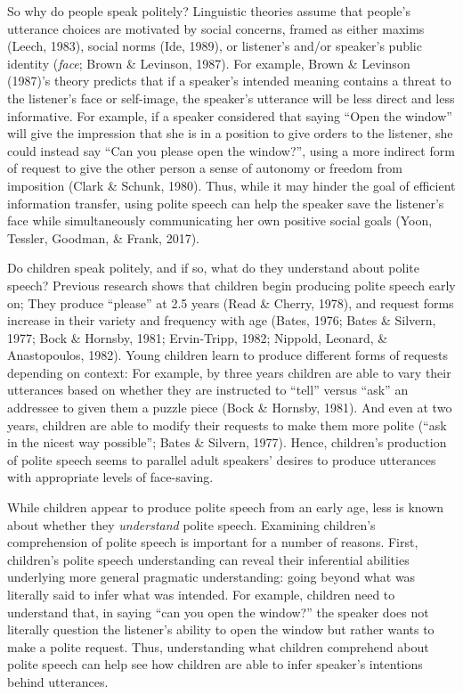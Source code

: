 \documentclass[10pt, letterpaper]{article}
\begin{document}
So why do people speak politely? Linguistic theories assume that
people's utterance choices are motivated by social concerns, framed as
either maxims (Leech, 1983), social norms (Ide, 1989), or listener's
and/or speaker's public identity (\emph{face}; Brown \& Levinson, 1987).
For example, Brown \& Levinson (1987)'s theory predicts that if a
speaker's intended meaning contains a threat to the listener's face or
self-image, the speaker's utterance will be less direct and less
informative. For example, if a speaker considered that saying ``Open the
window'' will give the impression that she is in a position to give
orders to the listener, she could instead say ``Can you please open the
window?'', using a more indirect form of request to give the other
person a sense of autonomy or freedom from imposition (Clark \& Schunk,
1980). Thus, while it may hinder the goal of efficient information
transfer, using polite speech can help the speaker save the listener's
face while simultaneously communicating her own positive social goals
(Yoon, Tessler, Goodman, \& Frank, 2017).

Do children speak politely, and if so, what do they understand about
polite speech? Previous research shows that children begin producing
polite speech early on; They produce ``please'' at 2.5 years (Read \&
Cherry, 1978), and request forms increase in their variety and frequency
with age (Bates, 1976; Bates \& Silvern, 1977; Bock \& Hornsby, 1981;
Ervin-Tripp, 1982; Nippold, Leonard, \& Anastopoulos, 1982). Young
children learn to produce different forms of requests depending on
context: For example, by three years children are able to vary their
utterances based on whether they are instructed to ``tell'' versus
``ask'' an addressee to given them a puzzle piece (Bock \& Hornsby,
1981). And even at two years, children are able to modify their requests
to make them more polite (``ask in the nicest way possible''; Bates \&
Silvern, 1977). Hence, children's production of polite speech seems to
parallel adult speakers' desires to produce utterances with appropriate
levels of face-saving.

While children appear to produce polite speech from an early age, less
is known about whether they \emph{understand} polite speech. Examining
children's comprehension of polite speech is important for a number of
reasons. First, children's polite speech understanding can reveal their
inferential abilities underlying more general pragmatic understanding:
going beyond what was literally said to infer what was intended. For
example, children need to understand that, in saying ``can you open the
window?'' the speaker does not literally question the listener's ability
to open the window but rather wants to make a polite request. Thus,
understanding what children comprehend about polite speech can help see
how children are able to infer speaker's intentions behind utterances.
\end{document}
